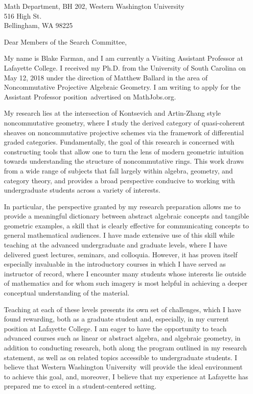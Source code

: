 \documentclass[12pt]{letter}
\date{\today}
\def\school{Western Washington University}
\def\courses{linear or abstract algebra, and algebraic geometry}
\def\position{Assistant Professor position}
\def\posloc{MathJobs.org}
\begin{document}
\begin{letter}{
    Math Department, BH 202, Western Washington University\\
    516 High St.\\
    Bellingham, WA 98225
  }
  \opening{Dear Members of the Search Committee,}


    My name is Blake Farman, and I am currently a Visiting Assistant Professor at Lafayette College.
  I received my Ph.D. from the University of South Carolina on May 12, 2018 under the direction of Matthew Ballard in the area of Noncommutative Projective Algebraic Geometry.
  I am writing to apply for the \position\ advertised on \posloc.

  My research lies at the intersection of Kontsevich and Artin-Zhang style noncommutative geometry, where I study the derived category of quasi-coherent sheaves on noncommutative projective schemes via the framework of differential graded categories.
  Fundamentally, the goal of this research is concerned with constructing tools that allow one to turn the lens of modern geometric intuition towards understanding the structure of noncommutative rings.
  This work draws from a wide range of subjects that fall largely within algebra, geometry, and category theory, and provides a broad perspective conducive to working with undergraduate students across a variety of interests.

  In particular, the perspective granted by my research preparation allows me to provide a meaningful dictionary between abstract algebraic concepts and tangible geometric examples, a skill that is clearly effective for communicating concepts to general mathematical audiences.
  I have made extensive use of this skill while teaching at the advanced undergraduate and graduate levels, where I have delivered guest lectures, seminars, and colloquia.
  However, it has proven itself especially invaluable in the introductory courses in which I have served as instructor of record, where I encounter many students whose interests lie outside of mathematics and for whom such imagery is most helpful in achieving a deeper conceptual understanding of the material.%

  Teaching at each of these levels presents its own set of challenges, which I have found rewarding, both as a graduate student and, especially, in my current position at Lafayette College.
  I am eager to have the opportunity to teach advanced courses such as \courses, in addition to conducting research, both along the program outlined in my research statement, as well as on related topics accessible to undergraduate students.
  I believe that \school\ will provide the ideal environment to achieve this goal, and, moreover, I believe that my experience at Lafayette has prepared me to excel in a student-centered setting.%
  

\end{letter}
\end{document}
